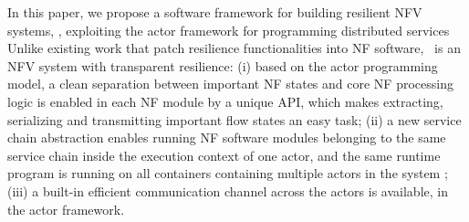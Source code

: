 In this paper, we propose a software framework for building resilient
NFV systems, \nfactor, exploiting the actor framework for programming distributed services \cite{actor-wiki, akka, newell2016optimizing} %
Unlike existing work
\cite{gember2015opennf, sherry2015rollback} that patch resilience
functionalities into NF software, \nfactor~is an NFV
system with transparent resilience: (i) based on the actor programming model, a clean separation between important NF states and core NF processing logic is enabled in each NF module by a unique API, which makes extracting, serializing and transmitting important flow states an easy task; (ii) a new service chain abstraction enables running NF software modules belonging to the same service chain inside the
execution context of one actor, and the same runtime program is running on all containers containing multiple actors in the system %
;
(iii) a built-in efficient communication channel across the actors is available, in the actor framework.





